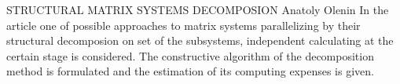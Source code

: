 STRUCTURAL MATRIX SYSTEMS DECOMPOSION
Anatoly Olenin
In the article one of possible approaches to matrix systems parallelizing by their structural
decomposion on set of the subsystems, independent calculating at the certain stage is
considered. The constructive algorithm of the decomposition method is formulated and the
estimation of its computing expenses is given.
